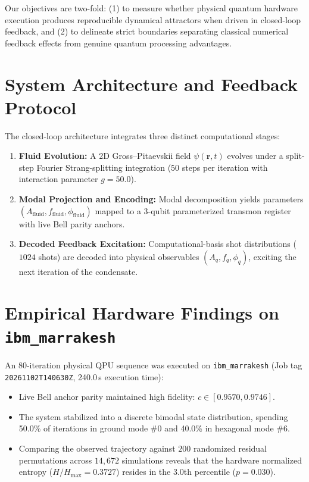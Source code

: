 \documentclass[11pt,a4paper]{article}
\begin{document}
Our objectives are two-fold: (1) to measure whether physical quantum hardware execution produces reproducible dynamical attractors when driven in closed-loop feedback, and (2) to delineate strict boundaries separating classical numerical feedback effects from genuine quantum processing advantages.

\section{System Architecture and Feedback Protocol}
The closed-loop architecture integrates three distinct computational stages:
\begin{enumerate}
  \item \textbf{Fluid Evolution:} A 2D Gross--Pitaevskii field $\psi(\mathbf{r}, t)$ evolves under a split-step Fourier Strang-splitting integration ($50$ steps per iteration with interaction parameter $g = 50.0$).
  \item \textbf{Modal Projection and Encoding:} Modal decomposition yields parameters $(A_{\text{fluid}}, f_{\text{fluid}}, \phi_{\text{fluid}})$ mapped to a 3-qubit parameterized transmon register with live Bell parity anchors.
  \item \textbf{Decoded Feedback Excitation:} Computational-basis shot distributions ($1024$ shots) are decoded into physical observables $(A_q, f_q, \phi_q)$, exciting the next iteration of the condensate.
\end{enumerate}

\section{Empirical Hardware Findings on \texttt{ibm\_marrakesh}}
An 80-iteration physical QPU sequence was executed on \texttt{ibm\_marrakesh} (Job tag \texttt{20261102T140630Z}, 240.0\,s execution time):
\begin{itemize}
  \item Live Bell anchor parity maintained high fidelity: $c \in [0.9570, 0.9746]$.
  \item The system stabilized into a discrete bimodal state distribution, spending 50.0\% of iterations in ground mode \#0 and 40.0\% in hexagonal mode \#6.
  \item Comparing the observed trajectory against $200$ randomized residual permutations across $14{,}672$ simulations reveals that the hardware normalized entropy ($H/H_{\text{max}} = 0.3727$) resides in the 3.0th percentile ($p = 0.030$).
\end{itemize}
\end{document}
